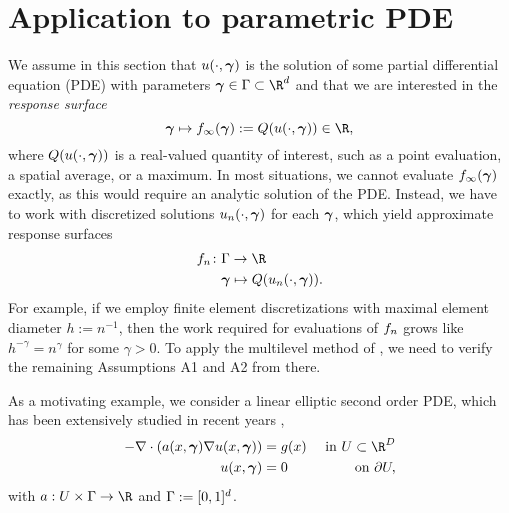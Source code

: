 \section{Application to parametric PDE}
\label{sec:uq}

We assume in this section that $u(\cdot,\bm{\gamma})$ is the solution of some partial differential equation (PDE) with parameters $\psmi\in\domPS\subset\R^\dps$ and that we are interested in the \emph{response surface}
\begin{equation*}
\psmi\mapsto \rs_{\infty}(\psmi):=\QoI(\pde(\cdot,\psmi))\in\R,
\end{equation*}
where $Q(u(\cdot,\bm{\gamma}))$ is a real-valued quantity of interest, such as a point evaluation, a spatial average, or a maximum.  
In most situations, we cannot evaluate $f_{\infty}(\bm{\gamma})$ exactly, as this would require an analytic solution of the PDE. Instead, we have to work with discretized solutions $u_{n}(\cdot,\bm{\gamma})$ for each $\bm{\gamma}$, which yield approximate response surfaces
\begin{equation*}
\begin{split}
\rs_{n}\colon &\domPS\to\R \\
&\psmi\mapsto Q(\pde_{n}(\cdot,\psmi)).
\end{split}
\end{equation*}
For example, if we employ finite element discretizations with maximal element diameter $h:=n^{-1}$, then the work required for evaluations of $f_{n}$ grows like $h^{-\gamma}=n^{\gamma}$ for some $\gamma>0$. To apply the multilevel method of , we need to verify the remaining Assumptions A1 and A2 from there. 

As a motivating example, we consider a linear elliptic second order PDE, which has been extensively studied in recent years \cite{harbrecht2013multilevel,ChkifaCohenSchwab2015,CohenDevoreSchwab2011,BabuskaTemponeZouraris2004},
\begin{equation}
\label{eq:UQex}
\begin{aligned}
-\nabla \cdot (a(x,\psmi) \nabla \pde(x,\psmi))&=\rhs(x)&\text{ in }U\subset\R^{\dpde}\\
\pde(x,\psmi)&=0&\text{ on } \partial U,
\end{aligned}
\end{equation}
with $a:U\times \domPS\to\R$ and $\Gamma:=[0,1]^d$. 


